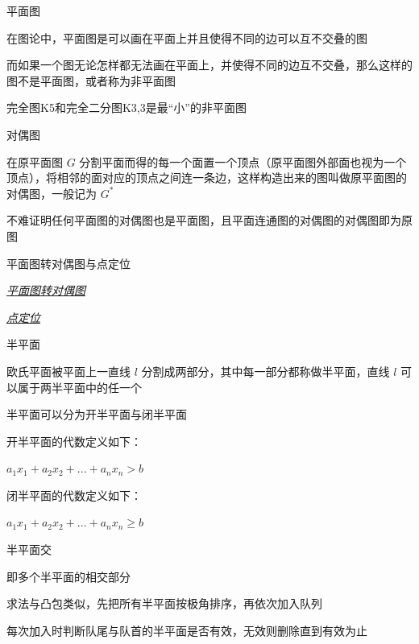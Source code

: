 \documentclass[UTF8]{beamer}
\begin{document}
			\begin{frame}{平面图}

			在图论中，平面图是可以画在平面上并且使得不同的边可以互不交叠的图

			而如果一个图无论怎样都无法画在平面上，并使得不同的边互不交叠，那么这样的图不是平面图，或者称为非平面图

			完全图K5和完全二分图K3,3是最“小”的非平面图

			\end{frame}

			\begin{frame}{对偶图}

			在原平面图 $G$ 分割平面而得的每一个面置一个顶点（原平面图外部面也视为一个顶点），将相邻的面对应的顶点之间连一条边，这样构造出来的图叫做原平面图的对偶图，一般记为 $G^*$

			不难证明任何平面图的对偶图也是平面图，且平面连通图的对偶图的对偶图即为原图

			\end{frame}

			\begin{frame}{平面图转对偶图与点定位}

			\href{http://blog.miskcoo.com/2015/05/planar-graph-dual-and-point-locate}{\emph{\underline{平面图转对偶图}}}

			\href{https://en.wikipedia.org/wiki/Point_location}{\emph{\underline{点定位}}}

			\end{frame}

			\begin{frame}{半平面}

			欧氏平面被平面上一直线 $l$ 分割成两部分，其中每一部分都称做半平面，直线 $l$ 可以属于两半平面中的任一个

			半平面可以分为开半平面与闭半平面

			开半平面的代数定义如下：

			$a_1x_1 + a_2x_2 + ... + a_nx_n > b$

			闭半平面的代数定义如下：

			$a_1x_1 + a_2x_2 + ... + a_nx_n \ge b$

			\end{frame}

			\begin{frame}{半平面交}

			即多个半平面的相交部分

			求法与凸包类似，先把所有半平面按极角排序，再依次加入队列

			每次加入时判断队尾与队首的半平面是否有效，无效则删除直到有效为止

			\end{frame}
\end{document}
